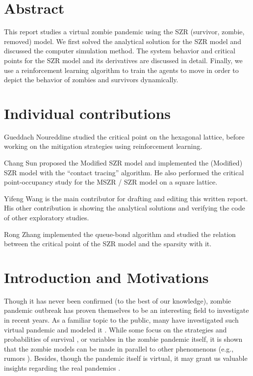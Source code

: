 \documentclass[11pt]{article}
\begin{document}

\tableofcontents

\newpage




\section{Abstract}
This report studies a virtual zombie pandemic using the SZR (survivor, zombie, removed) model. We first solved the analytical solution for the SZR model and discussed the computer simulation method. The system behavior and critical points for the SZR model and its derivatives are discussed in detail. Finally, we use a reinforcement learning algorithm to train the agents to move in order to depict the behavior of zombies and survivors dynamically.

\section{Individual contributions}

Gueddach Noureddine studied the critical point on the hexagonal lattice, before working on the mitigation strategies using reinforcement learning.

Chang Sun proposed the Modified SZR model and implemented the (Modified) SZR model with the ``contact tracing'' algorithm. He also performed the critical point-occupancy study for the MSZR / SZR model on a square lattice.

Yifeng Wang is the main contributor for drafting and editing this written report. His other contribution is showing the analytical solutions and verifying the code of other exploratory studies. 

Rong Zhang implemented the queue-bond algorithm and studied the relation between the critical point of the SZR model and the sparsity with it.

\section{Introduction and Motivations}
Though it has never been confirmed (to the best of our knowledge), zombie pandemic outbreak has proven themselves to be an interesting field to investigate in recent years. As a familiar topic to the public, many have investigated such virtual pandemic and modeled it \cite{casestudy} \cite{math_model_attack} \cite{bayesian} \cite{emotion}. While some focus on the strategies and probabilities of survival \cite{survival}, or variables \cite{emotion} in the zombie pandemic itself, it is shown that the zombie models can be made in parallel to other phenomenons (e.g., rumors \cite{rumor}). Besides, though the pandemic itself is virtual, it may grant us valuable insights regarding the real pandemics \cite{eval}.
\end{document}
